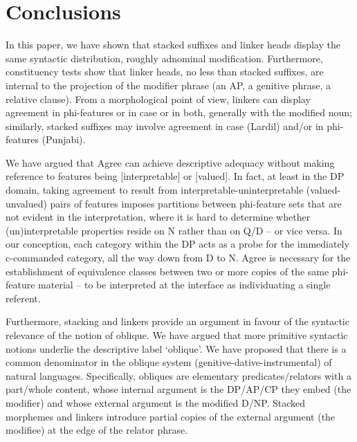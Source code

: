 \documentclass[output=paper]{langsci/langscibook}
\begin{document}
\section{Conclusions}%

In this paper, we have shown that stacked suffixes and linker heads display the same syntactic distribution, roughly adnominal modification. Furthermore, constituency tests show that linker heads, no less than stacked suffixes, are internal to the projection of the modifier phrase (an AP, a genitive phrase, a relative clause). From a morphological point of view, linkers can display agreement in phi-features or in case or in both, generally with the modified noun; similarly, stacked suffixes may involve agreement in case (Lardil) and/or in phi-features (Punjabi). 

  We have argued that Agree can achieve descriptive adequacy without making reference to features being [interpretable] or [valued]. In fact, at least in the DP domain, taking agreement to result from interpretable-uninterpretable (valued-unvalued) pairs of features imposes partitions between phi-feature sets that are not evident in the interpretation, where it is hard to determine whether (un)interpretable properties reside on N rather than on Q/D – or vice versa. In our conception, each category within the DP acts as a probe for the immediately c-commanded category, all the way down from D to N. Agree is necessary for the establishment of equivalence classes between two or more copies of the same phi-feature material – to be interpreted at the interface as individuating a single referent. 

Furthermore, stacking and linkers provide an argument in favour of the syntactic relevance of the notion of oblique. We have argued that more primitive syntactic notions underlie the descriptive label ‘oblique’. We have proposed that there is a common denominator in the oblique system (genitive-dative-instrumental) of natural languages. Specifically, obliques are elementary predicates/relators with a part/whole content, whose internal argument is the DP/AP/CP they embed (the modifier) and whose external argument is the modified D/NP. Stacked morphemes and linkers introduce partial copies of the external argument (the modifiee) at the edge of the relator phrase. 
\end{document}
